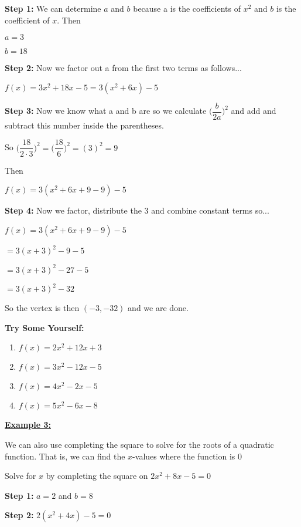 \documentclass[12pt]{article}
\newenvironment{myindentpar}[1]%
     {\begin{list}{}%
             {\setlength{\leftmargin}{#1}}%
             \item[]%
     }
     {\end{list}}
\begin{document}
\textbf{Step 1:} We can determine $a$ and $b$ because a is the coefficients of $x^2$ and $b$ is the coefficient of $x$. Then

$a =3$

$b = 18$

\textbf{Step 2:} Now we factor out a from the first two terms as follows...

$f(x)=3x^2 + 18x - 5 = 3(x^2 +6x) - 5$

\textbf{Step 3:} Now we know what a and b are so we calculate $\Big(\dfrac{b}{2a}\Big)^2$ and add and subtract this number inside the parentheses.

So $\Big(\dfrac{18}{2 \cdot 3}\Big)^2 = \Big(\dfrac{18}{6}\Big)^2 = (3)^2 = 9$

Then

$f(x) = 3(x^2 +6x +9 - 9) - 5$

\textbf{Step 4:} Now we factor, distribute the 3 and combine constant terms so...

$f(x) = 3(x^2 +6x +9 - 9) - 5$

\hspace{.8cm} $=3(x+ 3)^2 - 9- 5$

\hspace{.8cm}$= 3(x + 3)^2 - 27 - 5$

\hspace{.8cm}$= 3(x + 3)^2 - 32$

So the vertex is then $(-3, -32)$ and we are done.


\textbf{Try Some Yourself:}

\begin{enumerate}
\item$f(x)=2x^2 + 12x +3$
\item $f(x)=3x^2 - 12x - 5$
\item $f(x)=4x^2 - 2x - 5$
\item $f(x)=5x^2 - 6x - 8$
\end{enumerate}

{\bf\underline{Example 3:}}
\begin{myindentpar}{1cm}
We can also use completing the square to solve for the roots of a quadratic function. That is, we can find the $x$-values where the function is 0

Solve for $x$ by completing the square on $2x^2 +8x - 5=0$
\end{myindentpar}

\textbf{Step 1:} $a = 2$ and $b =8$

\textbf{Step 2:} $2(x^2 +4x) - 5=0$
\end{document}
